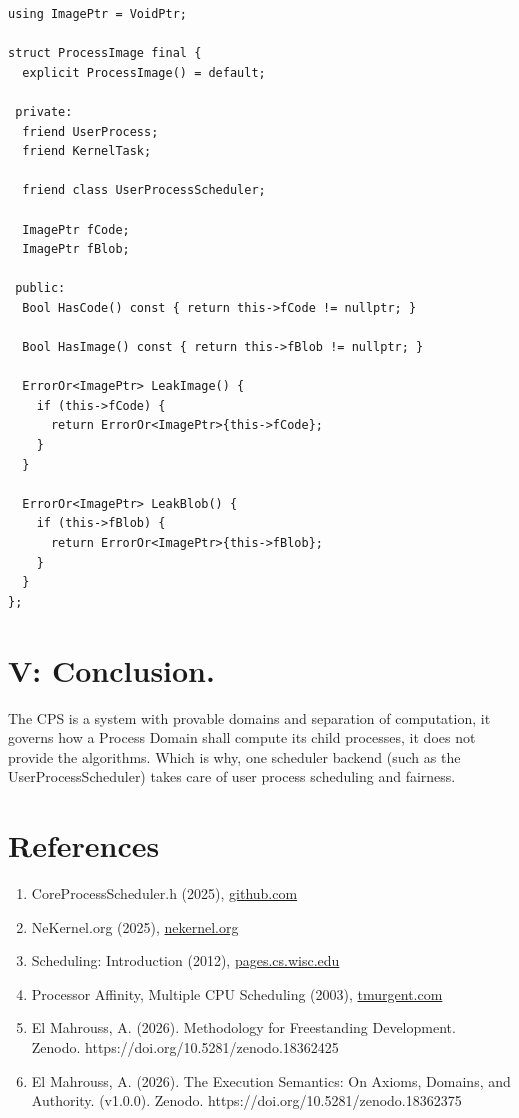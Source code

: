 \documentclass[11pt, a4paper]{article}
\begin{document}
\begin{lstlisting}
using ImagePtr = VoidPtr;

struct ProcessImage final {
  explicit ProcessImage() = default;

 private:
  friend UserProcess;
  friend KernelTask;

  friend class UserProcessScheduler;

  ImagePtr fCode;
  ImagePtr fBlob;

 public:
  Bool HasCode() const { return this->fCode != nullptr; }

  Bool HasImage() const { return this->fBlob != nullptr; }

  ErrorOr<ImagePtr> LeakImage() {
    if (this->fCode) {
      return ErrorOr<ImagePtr>{this->fCode};
    }
  }

  ErrorOr<ImagePtr> LeakBlob() {
    if (this->fBlob) {
      return ErrorOr<ImagePtr>{this->fBlob};
    }
  }
};
\end{lstlisting}

\section{V: Conclusion.}

{The CPS is a system with provable domains and separation of computation, it governs how a Process Domain shall compute its child processes, it does not provide the algorithms.} {Which is why, one scheduler backend (such as the UserProcessScheduler) takes care of user process scheduling and fairness.}

\section{References}

\begin{enumerate}
    \item CoreProcessScheduler.h (2025), \href{https://github.com/nekernel-org/nekernel/blob/develop/src/kernel/KernelKit/CoreProcessScheduler.h}{github.com}
    
    \item NeKernel.org (2025), \href{https://nekernel.org/nekernel}{nekernel.org}
    \item Scheduling: Introduction (2012), \href{https://pages.cs.wisc.edu/~remzi/OSTEP/cpu-sched.pdf}{pages.cs.wisc.edu}
    
    \item  Processor Affinity, Multiple CPU Scheduling (2003), \href{https://www.tmurgent.com/WhitePapers/ProcessorAffinity.pdf}{tmurgent.com}
    
    \item El Mahrouss, A. (2026). Methodology for Freestanding Development.\\ Zenodo. https://doi.org/10.5281/zenodo.18362425
    
    \item El Mahrouss, A. (2026). The Execution Semantics: On Axioms, Domains, and Authority. (v1.0.0). Zenodo. https://doi.org/10.5281/zenodo.18362375
\end{enumerate}
\end{document}

